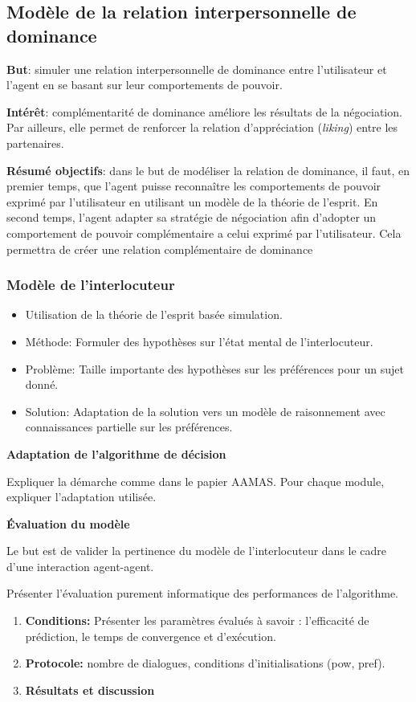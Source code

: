 \documentclass [french]{article}
\begin{document}
	\subsection{Modèle de la relation interpersonnelle de dominance}
	\textbf{But}: simuler une relation interpersonnelle de dominance entre l'utilisateur et l'agent en se basant sur leur comportements de pouvoir. 
	
	\textbf{Intérêt}: complémentarité de dominance améliore les résultats de la négociation. Par ailleurs, elle permet de renforcer la relation d'appréciation (\emph{liking}) entre les partenaires.  
	
	\textbf{Résumé objectifs}: dans le but de modéliser la relation de dominance, il faut, en premier temps, que l'agent puisse reconnaître les comportements de pouvoir exprimé par l'utilisateur en utilisant un modèle de la théorie de l'esprit. En second temps, l'agent adapter sa stratégie de négociation afin d'adopter un comportement de pouvoir complémentaire a celui exprimé par l'utilisateur. Cela permettra de créer une relation complémentaire de dominance 
	
	\subsubsection{Modèle de l'interlocuteur}
		\begin{itemize}
			\item Utilisation de la théorie de l'esprit basée simulation. 
			\item Méthode: Formuler des hypothèses sur l'état mental de l'interlocuteur.
			\item Problème: Taille importante des hypothèses sur les préférences pour un sujet donné. 
			\item Solution: Adaptation de la solution vers un modèle de raisonnement avec connaissances partielle sur les préférences. 
		\end{itemize}
		
		\textbf{Adaptation de l'algorithme de décision}
		
			\par Expliquer la démarche comme dans le papier AAMAS. Pour chaque module, expliquer l'adaptation utilisée.
			
		\textbf{Évaluation du modèle}
		
			Le but est de valider la pertinence du modèle de l'interlocuteur dans le cadre d'une interaction agent-agent. 
			\par Présenter l'évaluation purement informatique des performances de l'algorithme.
			\begin{enumerate}
					\item \textbf{Conditions:} Présenter les paramètres évalués à savoir : l'efficacité de prédiction, le temps de convergence et d'exécution.
					\item \textbf{Protocole:} nombre de dialogues, conditions d'initialisations (pow, pref).
					\item \textbf{Résultats et discussion}
			\end{enumerate}
	
\end{document}
